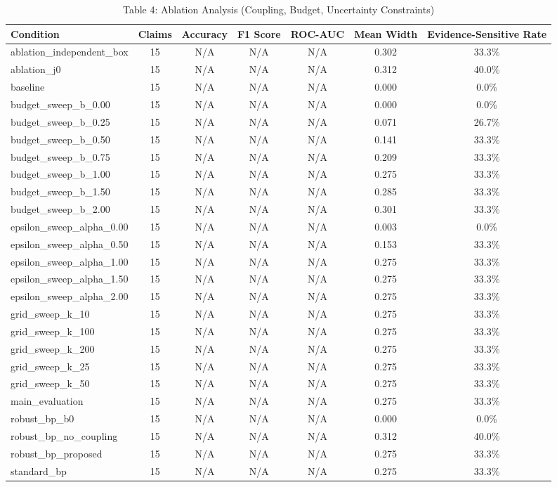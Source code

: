 \begin{table}[htbp]
\centering
\caption{Table 4: Ablation Analysis (Coupling, Budget, Uncertainty Constraints)}
\label{tab:table4_ablation_study}
\begin{tabular}{lcccccc}
\hline
Condition & Claims & Accuracy & F1 Score & ROC-AUC & Mean Width & Evidence-Sensitive Rate \\
\hline
ablation\_independent\_box & 15 & N/A & N/A & N/A & 0.302 & 33.3\% \\
ablation\_j0 & 15 & N/A & N/A & N/A & 0.312 & 40.0\% \\
baseline & 15 & N/A & N/A & N/A & 0.000 & 0.0\% \\
budget\_sweep\_b\_0.00 & 15 & N/A & N/A & N/A & 0.000 & 0.0\% \\
budget\_sweep\_b\_0.25 & 15 & N/A & N/A & N/A & 0.071 & 26.7\% \\
budget\_sweep\_b\_0.50 & 15 & N/A & N/A & N/A & 0.141 & 33.3\% \\
budget\_sweep\_b\_0.75 & 15 & N/A & N/A & N/A & 0.209 & 33.3\% \\
budget\_sweep\_b\_1.00 & 15 & N/A & N/A & N/A & 0.275 & 33.3\% \\
budget\_sweep\_b\_1.50 & 15 & N/A & N/A & N/A & 0.285 & 33.3\% \\
budget\_sweep\_b\_2.00 & 15 & N/A & N/A & N/A & 0.301 & 33.3\% \\
epsilon\_sweep\_alpha\_0.00 & 15 & N/A & N/A & N/A & 0.003 & 0.0\% \\
epsilon\_sweep\_alpha\_0.50 & 15 & N/A & N/A & N/A & 0.153 & 33.3\% \\
epsilon\_sweep\_alpha\_1.00 & 15 & N/A & N/A & N/A & 0.275 & 33.3\% \\
epsilon\_sweep\_alpha\_1.50 & 15 & N/A & N/A & N/A & 0.275 & 33.3\% \\
epsilon\_sweep\_alpha\_2.00 & 15 & N/A & N/A & N/A & 0.275 & 33.3\% \\
grid\_sweep\_k\_10 & 15 & N/A & N/A & N/A & 0.275 & 33.3\% \\
grid\_sweep\_k\_100 & 15 & N/A & N/A & N/A & 0.275 & 33.3\% \\
grid\_sweep\_k\_200 & 15 & N/A & N/A & N/A & 0.275 & 33.3\% \\
grid\_sweep\_k\_25 & 15 & N/A & N/A & N/A & 0.275 & 33.3\% \\
grid\_sweep\_k\_50 & 15 & N/A & N/A & N/A & 0.275 & 33.3\% \\
main\_evaluation & 15 & N/A & N/A & N/A & 0.275 & 33.3\% \\
robust\_bp\_b0 & 15 & N/A & N/A & N/A & 0.000 & 0.0\% \\
robust\_bp\_no\_coupling & 15 & N/A & N/A & N/A & 0.312 & 40.0\% \\
robust\_bp\_proposed & 15 & N/A & N/A & N/A & 0.275 & 33.3\% \\
standard\_bp & 15 & N/A & N/A & N/A & 0.275 & 33.3\% \\
\hline
\end{tabular}
\end{table}